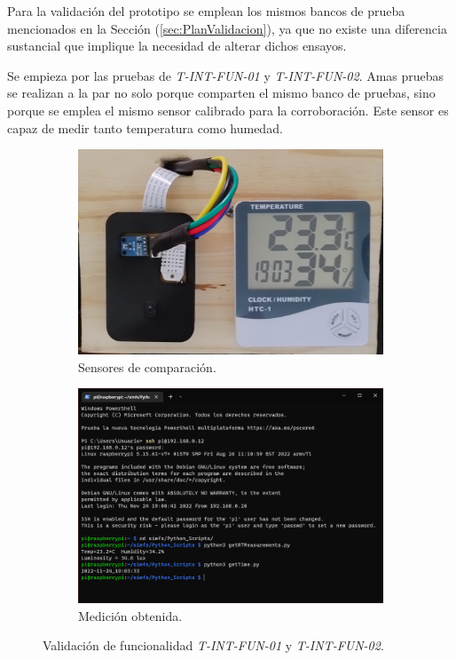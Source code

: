 Para la validación del prototipo se emplean los mismos bancos de prueba mencionados en la Sección (\ref{sec:PlanValidacion}), ya que no existe una diferencia sustancial que implique la necesidad de alterar dichos ensayos.


Se empieza por las pruebas de \textit{T-INT-FUN-01} y \textit{T-INT-FUN-02}. Amas pruebas se realizan a la par no solo porque comparten el mismo banco de pruebas, sino porque se emplea el mismo sensor calibrado para la corroboración. Este sensor es capaz de medir tanto temperatura como humedad.
\begin{figure}[H]
\centering
	\begin{subfigure}{0.39\textwidth}
    	\centering
        \includegraphics[width=\linewidth]{ImagenesValidacion del prototipo/T-INT-FUN-1-2-Medicion}		
		\caption{Sensores de comparación.}
	\end{subfigure}\hfill
    \begin{subfigure}{0.6\textwidth}
    	\centering
        \includegraphics[width=\linewidth]{ImagenesValidacion del prototipo/T-INT-FUN-1-2}		
        \caption{Medición obtenida.}
	\end{subfigure}
	\caption{Validación de funcionalidad \textit{T-INT-FUN-01} y \textit{T-INT-FUN-02}.}
\end{figure}

